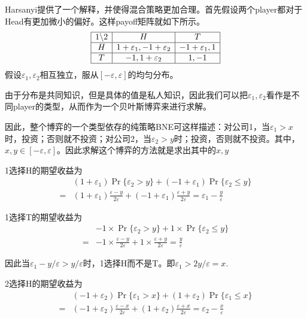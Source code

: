 \documentclass[UTF8,12pt]{ctexart}
\numberwithin{equation}{section} %
\numberwithin{figure}{section}
\numberwithin{table}{section}
\begin{document}
	Harsanyi提供了一个解释，并使得混合策略更加合理。首先假设两个player都对于Head有更加微小的偏好。这样payoff矩阵就如下所示。
	\begin{equation}
		\begin{array}{|c|c|c|}
			\hline
			1 \backslash 2 & H & T \\
			\hline
			H & 1 + \varepsilon_1,-1 + \varepsilon_2 & -1 + \varepsilon_1,1 \\
			\hline
			T & -1,1 + \varepsilon_2 & 1,-1 \\
			\hline
		\end{array}
	\end{equation}
	假设$\varepsilon_1,\varepsilon_2$相互独立，服从$[-\varepsilon,\varepsilon]$的均匀分布。
	
	由于分布是共同知识，但是具体的值是私人知识，因此我们可以把$\varepsilon_1,\varepsilon_2$看作是不同player的类型，从而作为一个贝叶斯博弈来进行求解。
	
	因此，整个博弈的一个类型依存的纯策略BNE可这样描述：对公司1，当$\varepsilon_1>x$时，投资；否则就不投资；对公司2，当$\varepsilon_2>y$时；投资，否则就不投资。其中，$x,y \in [-\varepsilon,\varepsilon]$。因此求解这个博弈的方法就是求出其中的$x,y$
	
	1选择H的期望收益为
	\begin{equation}
		\begin{aligned}
			&(1 + \varepsilon_1)\Pr\{\varepsilon_2 > y\} + (-1 + \varepsilon_1)\Pr\{\varepsilon_2 \leqslant y\} \\
			=&(1 + \varepsilon_1)\frac{\varepsilon-y}{2\varepsilon} + (-1 + \varepsilon_1)\frac{\varepsilon+y}{2\varepsilon} = \varepsilon_1 - \frac{y}{\varepsilon}
		\end{aligned}
	\end{equation}

	1选择T的期望收益为
	\begin{equation}
		\begin{aligned}
			&-1 \times \Pr\{\varepsilon_2 > y\} + 1 \times \Pr\{\varepsilon_2 \leqslant y\} \\
			=&-1 \times \frac{\varepsilon-y}{2\varepsilon} + 1 \times \frac{\varepsilon+y}{2\varepsilon} = \frac{y}{\varepsilon}
		\end{aligned}
	\end{equation}

	因此当$\varepsilon_1 - y/\varepsilon > y/\varepsilon$时，1选择H而不是T。即$\varepsilon_1 > 2y/\varepsilon = x$.
	
	2选择H的期望收益为
	\begin{equation}
		\begin{aligned}
			&(-1 + \varepsilon_2)\Pr\{\varepsilon_1 > x\} + (1 + \varepsilon_2)\Pr\{\varepsilon_1 \leqslant x\} \\
			=&(-1 + \varepsilon_2)\frac{\varepsilon - x}{2\varepsilon} + (1 + \varepsilon_2)\frac{\varepsilon + x}{2\varepsilon} = \varepsilon_2 - \frac{x}{\varepsilon}
		\end{aligned}
	\end{equation}
\end{document}
